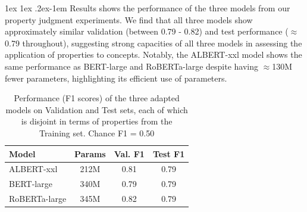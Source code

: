 \documentclass[10pt,letterpaper]{article}
\makeatletter
\newcommand{\km}[1]{\textcolor{purple}{$_{KM}$[#1]}}
\renewcommand{\paragraph}{%
  \@startsection{paragraph}{4}%
  {\z@}{1ex \@plus 1ex \@minus .2ex}{-1em}%
  {\normalfont\normalsize\bfseries}%
}
\makeatother
\begin{document}

\paragraph{Results}
 shows the performance of the three models from our property judgment experiments. 
We find that all three models show approximately similar validation (between 0.79 - 0.82) and test performance ($\approx$ 0.79 throughout), suggesting strong capacities of all three models in assessing the application of properties to concepts. Notably, the ALBERT-xxl model shows the same performance as BERT-large and RoBERTa-large despite having $\approx$130M fewer parameters, highlighting its efficient use of parameters.

\begin{table}[t!]
\vspace{-1em}
\def\arraystretch{1.15}
\centering
\caption{Performance (F1 scores) of the three adapted models on Validation and Test sets, each of which is disjoint in terms of properties from the Training set. Chance F1 = 0.50}
\label{tab:f1}
\vspace{0.5em}
\begin{tabular}{|l|c|c|c|}
\hline
\textbf{Model} & \textbf{Params} & \textbf{Val. F1} & \textbf{Test F1} \\ \hline
ALBERT-xxl     & 212M            & 0.81             & 0.79    \\
BERT-large     & 340M            & 0.79             & 0.79    \\
RoBERTa-large  & 345M            & 0.82    & 0.79    \\ \hline
\end{tabular}
\end{table}
\end{document}
